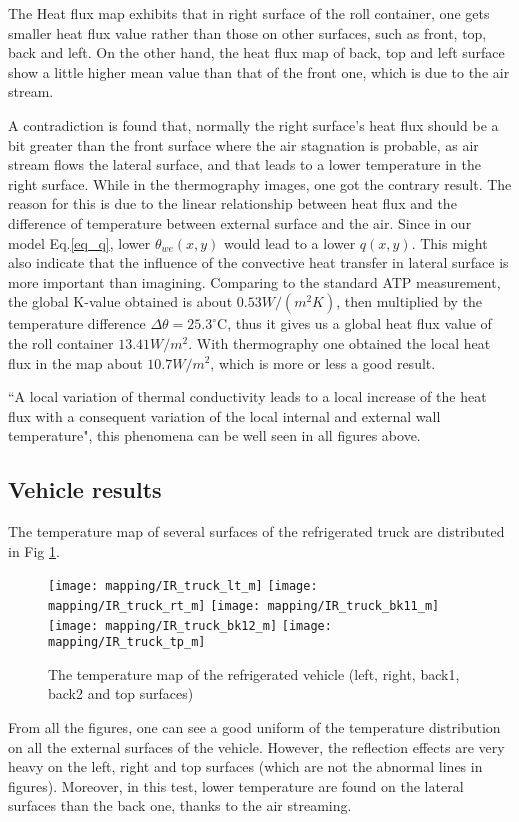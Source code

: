 The Heat flux map exhibits that in right surface of the roll container, one gets smaller heat flux value rather than those on other surfaces, such as front, top, back and left.
On the other hand, the heat flux map of back, top and left surface show a little higher mean value than that of the front one, which is due to the air stream.

A contradiction is found that, normally the right surface's heat flux should be a bit greater than the front surface where the air stagnation is probable, as air stream flows the lateral surface, and that leads to a lower temperature in the right surface. While in the thermography images, one got the contrary result. The reason for this is due to the linear relationship between heat flux and the difference of temperature between external surface and the air. Since in our model Eq.\ref{eq_q}, lower $\theta_{we}(x,y)$ would lead to a lower $q(x,y)$. This might also indicate that the influence of the convective heat transfer in lateral surface is more important than imagining.
Comparing to the standard ATP measurement, the global K-value obtained is about $0.53 W/(m^2 K)$, then multiplied by the temperature difference $\Delta \theta =25.3^\circ$C, thus it gives us a global heat flux value of the roll container $13.41 W/m^2$. With thermography one obtained the local heat flux in the map about $10.7 W/m^2$, which is more or less a good result.

``A local variation of thermal conductivity leads to a local increase of the heat flux with a consequent variation of the local internal and external wall temperature"\citep{rossi2009k}, this phenomena can be well seen in all figures above.

\subsection{Vehicle results}
The temperature map of several surfaces of the refrigerated truck are distributed in Fig \ref{IR_truck}.
\begin{figure}[!htbp]
	\centering
	\texttt{[image: mapping/IR\_truck\_lt\_m]}
	\hspace{6pt}
	\texttt{[image: mapping/IR\_truck\_rt\_m]}
	\vspace{3pt}
	\texttt{[image: mapping/IR\_truck\_bk11\_m]}
	\hspace{6pt}
	\texttt{[image: mapping/IR\_truck\_bk12\_m]}
	\texttt{[image: mapping/IR\_truck\_tp\_m]}
	\caption{The temperature map of the refrigerated vehicle (left, right, back1, back2 and top surfaces)}
	\label{IR_truck}
\end{figure}
From all the figures, one can see a good uniform of the temperature distribution on all the external surfaces of the vehicle. However, the reflection effects are very heavy on the left, right and top surfaces (which are not the abnormal lines in figures). Moreover, in this test, lower temperature are found on the lateral surfaces than the back one, thanks to the air streaming.

